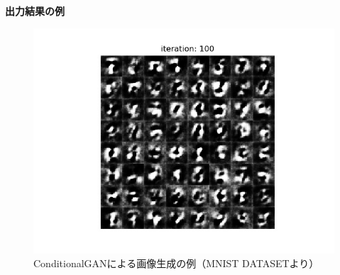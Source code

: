 \documentclass{jarticle}
\begin{document}
\textbf{出力結果の例}
\begin{figure}[h]
\centering
\includegraphics[width=12cm]{0100.jpg}
\caption{ConditionalGANによる画像生成の例（MNIST DATASETより）}
\label{GAN7}
\end{figure}


\end{document}
